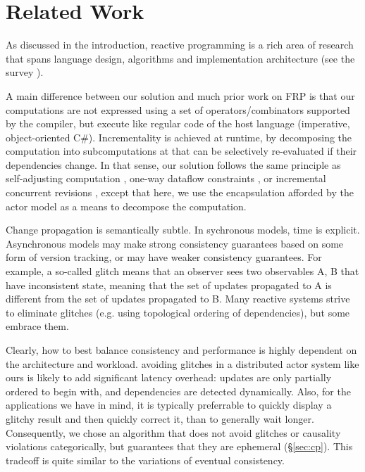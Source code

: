 \section{Related Work}

As discussed in the introduction, reactive programming is a rich area of research that spans language design, algorithms and implementation architecture (see the survey \cite{reactivesurvey}).

A main difference between our solution and much prior work on FRP \cite{frp-firstprinciples,frp-animation,frp-frtime,elm,afp} is that our computations are not expressed using a set of operators/combinators supported by the compiler, but execute like regular code of the host language (imperative, object-oriented C\#). Incrementality is achieved at runtime, by decomposing the computation into subcomputations at that can be selectively re-evaluated if their dependencies change. In that sense, our solution follows the same principle as self-adjusting computation \cite{acar-ahmed-blume-POPL08,Acar:SelfAdjustingExperiments,Acar:SelfAdjustingOverview,Hammer:Ceal09,Acar:SelfAdjustingTypes10}, one-way dataflow constraints \cite{camil}, or incremental concurrent revisions \cite{burckhardt-leijen-yi-sadowski-ball-OOPSLA11}, except that here, we use the encapsulation afforded by the actor model as a means to decompose the computation.


Change propagation is semantically subtle. In sychronous models, time is explicit. Asynchronous models may make strong consistency guarantees based on some form of version tracking, or may have weaker consistency guarantees. For example, a so-called glitch means that an observer sees two observables A, B that have inconsistent state, meaning that the set of updates propagated to A is different from the set of updates propagated to B. Many reactive systems strive to eliminate glitches (e.g. using topological ordering of dependencies), but some embrace them.

Clearly, how to best balance consistency and performance is highly dependent on the architecture and workload. 
avoiding glitches in a distributed actor system like ours is likely to add significant latency overhead: updates are only partially ordered to begin with, and dependencies are detected dynamically. Also, for the applications we have in mind, it is typically preferrable to quickly display a glitchy result and then quickly correct it, than to generally wait longer. Consequently, we chose an algorithm that does not avoid glitches or causality violations categorically, but guarantees that they are ephemeral (\S\ref{sec:cp}). This tradeoff is quite similar to the variations of eventual consistency.
 

